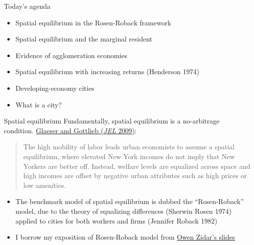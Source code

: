 \documentclass[11pt,notes=hide,aspectratio=169]{beamer}
\begin{document}
\begin{frame}{Today's agenda}
\begin{itemize}
\item Spatial equilibrium in the Rosen-Roback framework
\item Spatial equilibrium and the marginal resident
\item Evidence of agglomeration economies
\item Spatial equilibrium with increasing returns (Henderson 1974)
\item Developing-economy cities
\item What is a city?
\end{itemize}
\end{frame}
\begin{frame}{Spatial equilibrium}
Fundamentally, spatial equilibrium is a no-arbitrage condition.
\href{https://www.aeaweb.org/articles?id=10.1257/jel.47.4.983}{Glaeser and Gottlieb (\textit{JEL} 2009)}:
\begin{quote}
The high mobility of labor leads urban economists to assume a spatial equilibrium, where elevated New York incomes do not imply that New Yorkers are better off. Instead, welfare levels are equalized across space and high incomes are offset by negative urban attributes such as high prices or low amenities.
\end{quote}
\vspace{-4mm}
\begin{itemize}
	\item The benchmark model of spatial equilibrium is dubbed the ``Rosen-Roback'' model, due to the theory of equalizing differences (Sherwin Rosen 1974) applied to cities for both workers and firms (Jennifer Roback 1982)
	\item I borrow my exposition of Rosen-Roback model from \href{https://scholar.princeton.edu/sites/default/files/zidar/files/zidar_eco524_s2020_lec2.pdf}{Owen Zidar's slides}
\end{itemize}
\end{frame}
\end{document}
